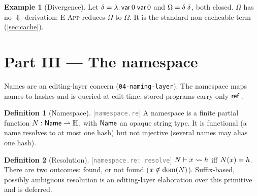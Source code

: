 \documentclass[11pt]{article}
\theoremstyle{definition}
\newtheorem{definition}{Definition}[section]
\newtheorem{example}{Example}[section]
\theoremstyle{plain}
\theoremstyle{remark}
\newcommand{\src}[1]{{\footnotesize\textcolor{gray}{[\texttt{#1}]}}}
\begin{document}
\begin{example}[Divergence]\label{ex:omega}
Let $\delta = \lambda.\,\mathsf{var}\,0\;\mathsf{var}\,0$ and $\Omega = \delta\;\delta$, both closed.
$\Omega$ has no $\Downarrow$-derivation: \textsc{E-App} reduces $\Omega$ to $\Omega$. It is the
standard non-cacheable term (\cref{sec:cache}).
\end{example}

\section{Part III --- The namespace}\label{sec:naming}

Names are an editing-layer concern (\texttt{04-naming-layer}). The namespace maps names to
hashes and is queried at edit time; stored programs carry only $\mathsf{ref}\,$.

\begin{definition}[Namespace]\label{def:ns}
\src{namespace.re} A namespace is a finite partial function $N : \mathsf{Name} \rightharpoonup \mathbb{H}$, with
$\mathsf{Name}$ an opaque string type. It is functional (a name resolves to at most one hash) but not
injective (several names may alias one hash).
\end{definition}

\begin{definition}[Resolution]\label{def:resolve}
\src{namespace.re: resolve} $N \vdash x \rightsquigarrow h$ iff $N(x) = h$. There are two
outcomes: found, or not found ($x \notin \operatorname{dom}(N)$). Suffix-based, possibly ambiguous
resolution is an editing-layer elaboration over this primitive and is deferred.
\end{definition}
\end{document}
